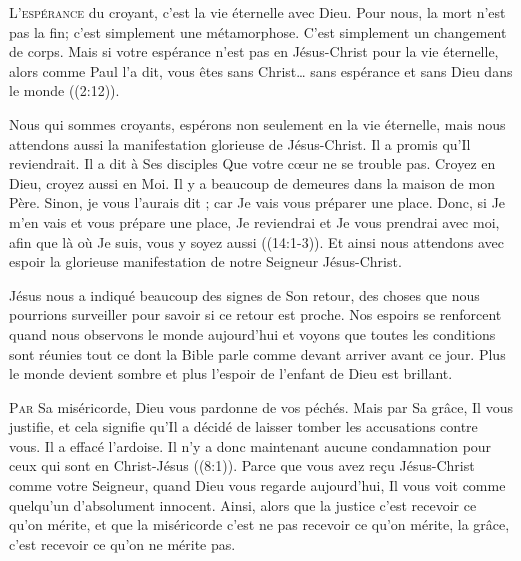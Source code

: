 \lettrine{L}{'espérance} du croyant, c'est la vie éternelle avec Dieu.
 Pour nous, la mort n'est pas la fin; c'est simplement une métamorphose.
 C'est simplement un changement de corps. Mais si votre espérance n'est pas
 en Jésus-Christ pour la vie éternelle, alors comme Paul l'a dit, vous êtes
 \Og sans Christ\dots{} sans espérance et sans Dieu dans le monde \Fg{}
 ((2:12)). 


Nous qui sommes croyants, espérons non seulement en la vie éternelle,
 mais nous attendons aussi la manifestation glorieuse de Jésus-Christ.
 Il a promis qu'Il reviendrait. Il a dit à Ses disciples\frcolon {}
 \Og Que votre c\oe{}ur ne se trouble pas. Croyez en Dieu, croyez aussi en Moi.
 Il y a beaucoup de demeures dans la maison de mon Père.
 Sinon, je vous l'aurais dit ; car Je vais vous préparer une place.
 Donc, si Je m'en vais et vous prépare une place, Je reviendrai
 et Je vous prendrai avec moi, afin que là où Je suis,
 vous y soyez aussi \Fg{} ((14:1-3)).
 Et ainsi nous attendons avec espoir la glorieuse manifestation
 de notre Seigneur Jésus-Christ. 

Jésus nous a indiqué beaucoup des signes de Son retour,
 des choses que nous pourrions surveiller pour savoir si ce retour est proche.
 Nos espoirs se renforcent quand nous observons le monde aujourd'hui
 et voyons que toutes les conditions sont réunies \ocadr tout ce dont la Bible
 parle comme devant arriver avant ce jour.
 Plus le monde devient sombre et plus l'espoir de l'enfant de Dieu
 est brillant. 

\dvrule






\lettrine{P}{ar} Sa miséricorde, Dieu vous pardonne de vos péchés.
 Mais par Sa grâce, Il vous justifie, et cela signifie qu'Il a décidé
 de laisser tomber les accusations contre vous. Il a effacé l'ardoise.
 \Og Il n'y a donc maintenant aucune condamnation pour ceux
 qui sont en Christ-Jésus \Fg{} ((8:1)).
 Parce que vous avez re\c{c}u Jésus-Christ comme votre Seigneur,
 quand Dieu vous regarde aujourd'hui, Il vous voit comme quelqu'un
 d'absolument innocent. Ainsi, alors que la justice c'est recevoir
 ce qu'on mérite, et que la miséricorde c'est ne pas recevoir
 ce qu'on mérite, la grâce, c'est recevoir ce qu'on ne mérite pas. 

